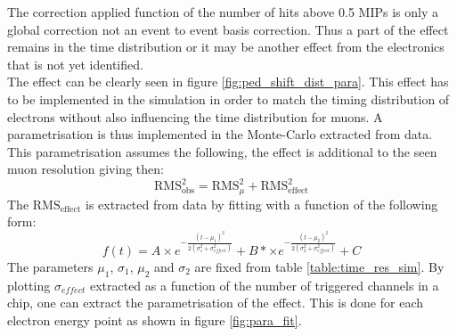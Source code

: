 \documentclass[twoside,a4paper,11pt]{article}
\begin{document}
\begin{appendix}
The correction applied function of the number of hits above 0.5 MIPs is only a global correction not an event to event basis correction. Thus a part of the effect remains in the time distribution or it may be another effect from the electronics that is not yet identified.\\
The effect can be clearly seen in figure \ref{fig:ped_shift_dist_para}. This effect has to be implemented in the simulation in order to match the timing distribution of electrons without also influencing the time distribution for muons. A parametrisation is thus implemented in the Monte-Carlo extracted from data. This parametrisation assumes the following, the effect is additional to the seen muon resolution giving then:
\begin{equation*}
\text{RMS}_{\text{obs}}^2 = \text{RMS}_{\mu}^2 + \text{RMS}_{\text{effect}}^2 
\end{equation*}
The $\text{RMS}_{\text{effect}}$ is extracted from data by fitting with a function of the following form:
\begin{equation*}
f(t) = A \times e^{-\frac{(t-\mu_1)^2}{2(\sigma_1^2 + \sigma_{effect}^2)}} + B* \times e^{-\frac{(t-\mu_2)^2}{2(\sigma_2^2 + \sigma_{effect}^2)}} + C
\end{equation*}
The parameters $\mu_1$, $\sigma_1$, $\mu_2$ and $\sigma_2$ are fixed from table \ref{table:time_res_sim}. By plotting $\sigma_{effect}$ extracted as a function of the number of triggered channels in a chip, one can extract the parametrisation of the effect. This is done for each electron energy point as shown in figure \ref{fig:para_fit}.
\begin{figure}[htbp]
	\hfill

\end{figure}
\end{appendix}
\end{document}
